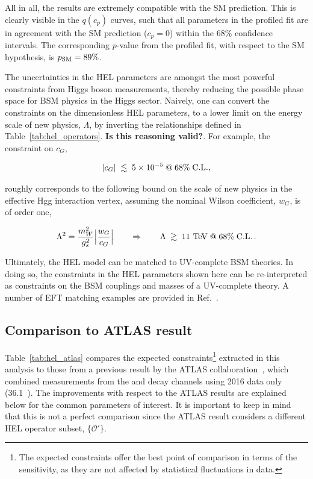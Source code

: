 All in all, the results are extremely compatible with the SM prediction. This is clearly visible in the $q(c_p)$ curves, such that all parameters in the profiled fit are in agreement with the SM prediction ($c_p=0$) within the 68\% confidence intervals. The corresponding $p$-value from the profiled fit, with respect to the SM hypothesis, is $p_{\rm{SM}}=89\%$. 

The uncertainties in the HEL parameters are amongst the most powerful constraints from Higgs boson measurements, thereby reducing the possible phase space for BSM physics in the Higgs sector. Naively, one can convert the constraints on the dimensionless HEL parameters, to a lower limit on the energy scale of new physics, $\Lambda$, by inverting the relationships defined in Table~\ref{tab:hel_operators}. \textbf{Is this reasoning valid?}. For example, the constraint on $c_G$,

\begin{equation}
    |c_G| \; \lesssim \; 5 \times 10^{-5} \; {\rm{@}} \; 68\% \; {\rm{C.L.}},
\end{equation}

\noindent
roughly corresponds to the following bound on the scale of new physics in the effective Hgg interaction vertex, assuming the nominal Wilson coefficient, $w_G$, is of order one,

\begin{equation}
    \Lambda^2 = \frac{m_W^2}{g_s^2}\Big| \frac{w_G}{c_G} \Big| \qquad \Rightarrow \qquad \Lambda \; \gtrsim \; 11~{\rm{TeV}} \; {\rm{@}} \; 68\% \; {\rm{C.L.}}\,.
\end{equation}

\noindent
Ultimately, the HEL model can be matched to UV-complete BSM theories. In doing so, the constraints in the HEL parameters shown here can be re-interpreted as constraints on the BSM couplings and masses of a UV-complete theory. A number of EFT matching examples are provided in Ref.~\cite{Marzocca:2020jze}. 

\subsection{Comparison to ATLAS result}
Table~\ref{tab:hel_atlas} compares the expected constraints\footnote{The expected constraints offer the best point of comparison in terms of the sensitivity, as they are not affected by statistical fluctuations in data.} extracted in this analysis to those from a previous result by the ATLAS collaboration~\cite{ATL-PHYS-PUB-2017-018}, which combined measurements from the \Hgg and \Hfl decay channels using 2016 data only (36.1~\fbinv). The improvements with respect to the ATLAS results are explained below for the common parameters of interest. It is important to keep in mind that this is not a perfect comparison since the ATLAS result considers a different HEL operator subset, $\{\mathcal{O}'\}$.

